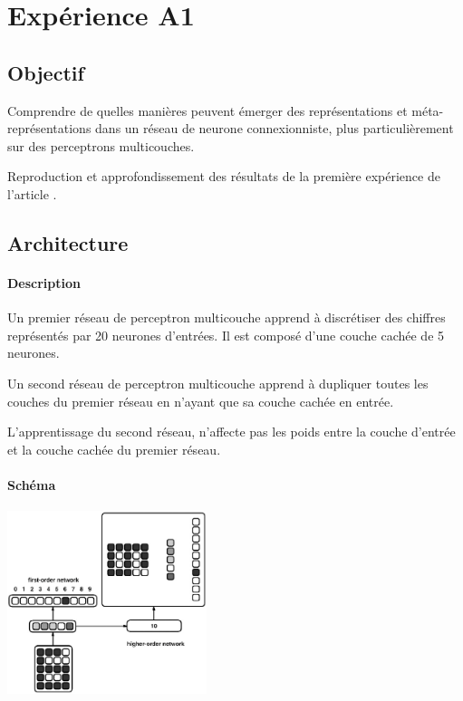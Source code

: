 \section{Expérience A1} \label{expA1}
  \subsection{Objectif}
    Comprendre de quelles manières peuvent émerger des représentations et méta-représentations dans 
    un réseau de neurone connexionniste, plus particulièrement sur des perceptrons multicouches.
    
    
    Reproduction et approfondissement des résultats de la première expérience de l'article 
    \cite{Cleeremans_2007}. 

  \subsection{Architecture}
    \paragraph{Description}
      Un premier réseau de perceptron multicouche apprend à discrétiser des chiffres représentés
      par 20 neurones d'entrées. Il est composé d'une couche cachée de 5 neurones.
      
      Un second réseau de perceptron multicouche apprend à dupliquer toutes les couches du premier
      réseau en n'ayant que sa couche cachée en entrée.
      
      L'apprentissage du second réseau, n'affecte pas les poids entre la couche d'entrée et la 
      couche cachée du premier réseau.

    \paragraph{Schéma}
      \begin{center}
	\includegraphics[width=220px]{data/expA1/schema.png}
      \end{center}
      
